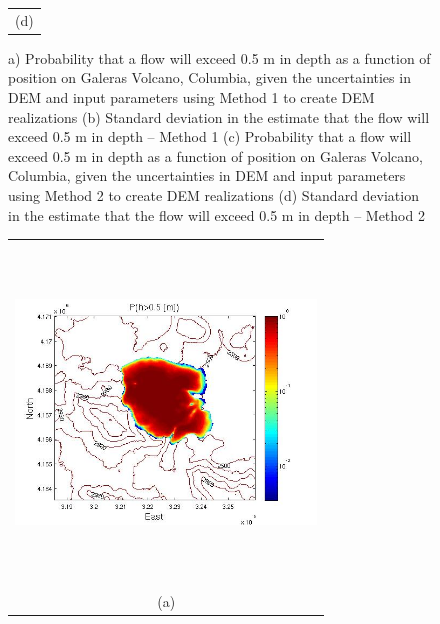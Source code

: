 \documentclass{article}
\newcommand{\Pic}[2][0.85]{\begin{center}\texttt{[image: \#2]}
 \end{center} }
\begin{document}
\begin{figure}[H]
\begin{minipage}{0.6\textwidth}
\begin{tabular}{c}
        (d)
        \end{tabular}
    \end{minipage} 
\caption{a) Probability that a flow will exceed 0.5 m in depth as a function of position on Galeras Volcano, Columbia, given the uncertainties in DEM and input parameters using  Method 1 to create DEM realizations (b) Standard deviation in the estimate that the flow will exceed 0.5 m in depth -- Method 1
(c) Probability that a flow will exceed 0.5 m in depth as a function of position on Galeras Volcano, Columbia, given the uncertainties in DEM and input parameters using Method 2 to create DEM realizations (d) Standard deviation in the estimate that the flow will exceed 0.5 m in depth -- Method 2}
\label{fig3}  
\end{figure}

\begin{figure}[H]
    \begin{minipage}[b]{0.6\textwidth}
        \begin{tabular}{c}
       \includegraphics[width=8cm,height=9cm,keepaspectratio]{figs/Mammoth_0_P_5m.jpg}\\
        (a)
        \end{tabular}
    \end{minipage}
    \begin{minipage}{0.6\textwidth}
        \begin{tabular}{c}

\end{tabular}
\end{minipage}
\end{figure}
\end{document}
